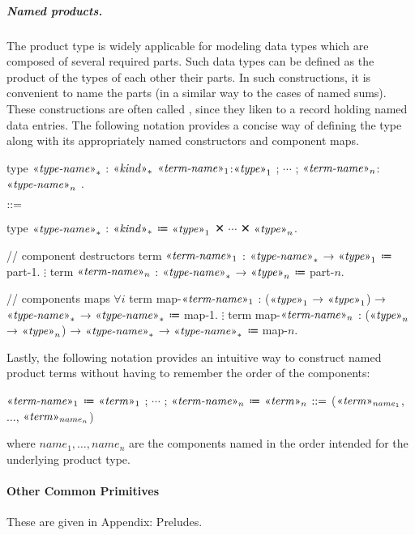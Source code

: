 \subparagraph{Named products.}
The product type is widely applicable for modeling data types which are composed of several required parts.
Such data types can be defined as the product of the types of each other their parts.
In such constructions, it is convenient to name the parts (in a similar way to the cases of named sums).
These constructions are often called , since they liken to a record holding named data entries.
The following notation provides a concise way of defining the type along with its appropriately named constructors and component maps.
\begin{notational}[caption={Notation for defining named products types and utilities}]
type $\mvar{type-name}_*$ : $\mvar{kind}_*$
  { $\mvar{term-name}_1$:$\mvar{type}_1$ ; $\cdots$ ; $\mvar{term-name}_n$:$\mvar{type-name}_n$ }.

$\syneq$

type $\mvar{type-name}_*$ : $\mvar{kind}_*$
  ≔ $\mvar{type}_1$ ✕ $\cdots$ ✕ $\mvar{type}_n$.

// component destructors
term $\mvar{term-name}_1$ : $\mvar{type-name}_*$ → $\mvar{type}_1$ ≔ part-1.
$\vdots$
term $\mvar{term-name}_n$ : $\mvar{type-name}_*$ → $\mvar{type}_n$ ≔ part-$n$.

// components maps $\forall i $
term map-$\mvar{term-name}_1$ : ($\mvar{type}_1$ → $\mvar{type}_1$) → $\mvar{type-name}_*$ → $\mvar{type-name}_*$
  ≔ map-1.
$\vdots$
term map-$\mvar{term-name}_n$ : ($\mvar{type}_n$ → $\mvar{type}_n$) → $\mvar{type-name}_*$ → $\mvar{type-name}_*$
  ≔ map-$n$.
\end{notational}
Lastly, the following notation provides an intuitive way to construct named product terms without having to remember the order of the components:
\begin{notational}[caption={Notation for constructing named product terms}]
{ $\mvar{term-name}_1$ ≔ $\mvar{term}_1$ ; $\cdots$ ; $\mvar{term-name}_n$ ≔ $\mvar{term}_n$ }
  $\syneq$
    ($\mvar{term}_{name_1}$, $\dots$, $\mvar{term}_{name_n}$)
\end{notational}
where $name_1, \dots, name_n$ are the components named in the order intended for the underlying product type.

\newpage
\paragraph{Other Common Primitives}
These are given in Appendix: Preludes.

